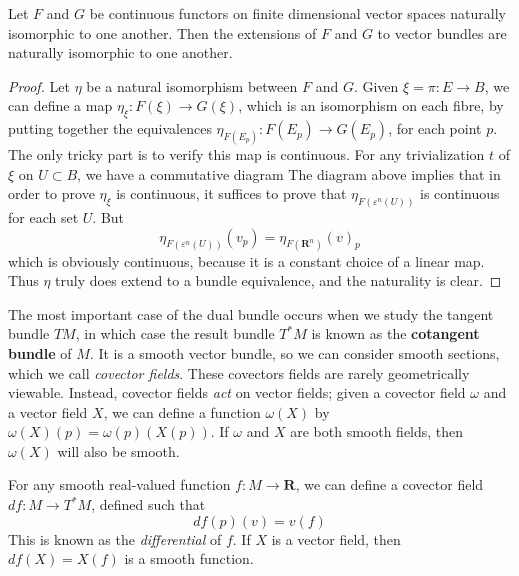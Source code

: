 \begin{theorem}
    Let $F$ and $G$ be continuous functors on finite dimensional vector spaces naturally isomorphic to one another. Then the extensions of $F$ and $G$ to vector bundles are naturally isomorphic to one another.
\end{theorem}
\begin{proof}
    Let $\eta$ be a natural isomorphism between $F$ and $G$. Given $\xi = \pi: E \to B$, we can define a map $\eta_\xi: F(\xi) \to G(\xi)$, which is an isomorphism on each fibre, by putting together the equivalences $\eta_{F(E_p)}: F(E_p) \to G(E_p)$, for each point $p$. The only tricky part is to verify this map is continuous. For any trivialization $t$ of $\xi$ on $U \subset B$, we have a commutative diagram
    The diagram above implies that in order to prove $\eta_\xi$ is continuous, it suffices to prove that $\eta_{F(\varepsilon^n(U))}$ is continuous for each set $U$. But
    \[ \eta_{F(\varepsilon^n(U))}(v_p) = \eta_{F(\mathbf{R}^n)}(v)_p \]
    which is obviously continuous, because it is a constant choice of a linear map. Thus $\eta$ truly does extend to a bundle equivalence, and the naturality is clear.
\end{proof}

The most important case of the dual bundle occurs when we study the tangent bundle $TM$, in which case the result bundle $T^*M$ is known as the {\bf cotangent bundle} of $M$. It is a smooth vector bundle, so we can consider smooth sections, which we call {\it covector fields}. These covectors fields are rarely geometrically viewable. Instead, covector fields {\it act} on vector fields; given a covector field $\omega$ and a vector field $X$, we can define a function $\omega(X)$ by $\omega(X)(p) = \omega(p)(X(p))$. If $\omega$ and $X$ are both smooth fields, then $\omega(X)$ will also be smooth.

\begin{example}
    For any smooth real-valued function $f: M \to \mathbf{R}$, we can define a covector field $df: M \to T^*M$, defined such that
    \[ df(p)(v) = v(f) \]
    This is known as the {\it differential} of $f$. If $X$ is a vector field, then $df(X) = X(f)$ is a smooth function.
\end{example}

